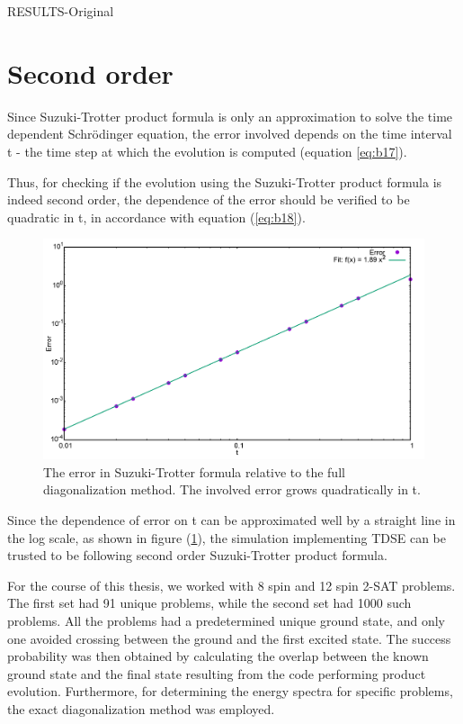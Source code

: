 \documentclass[12]{article}
\begin{document}
\begin{center}
\begin{Huge}
RESULTS-Original
\end{Huge}
\end{center}
\section{Second order}
Since Suzuki-Trotter product formula is only an approximation to solve the time dependent Schr{\"o}dinger equation, the error involved depends on the time interval t - the time step at which the evolution is computed (equation \ref{eq:b17}). 

Thus, for checking if the evolution using the Suzuki-Trotter product formula is indeed second order, the dependence of the error should be verified to be quadratic in t, in accordance with equation (\ref{eq:b18}). 
\begin{figure}[H]
\centering 
\includegraphics[scale=0.3]{Error.png}
\caption{The error in Suzuki-Trotter formula relative to the full diagonalization method. The involved error grows quadratically in t.}
\label{fig:o1}
\end{figure}
Since the dependence of error on t can be approximated well by a straight line in the log scale, as shown in figure (\ref{fig:o1}), the simulation implementing TDSE can be trusted to be following second order Suzuki-Trotter product formula.

For the course of this thesis, we worked with 8 spin and 12 spin 2-SAT problems. The first set had 91 unique problems, while the second set had 1000 such problems. All the problems had a predetermined unique ground state, and only one avoided crossing between the ground and the first excited state. The success probability was then obtained by calculating the overlap between the known ground state and the final state resulting from the code performing product evolution. Furthermore, for determining the energy spectra for specific problems, the exact diagonalization method was employed.
\end{document}
